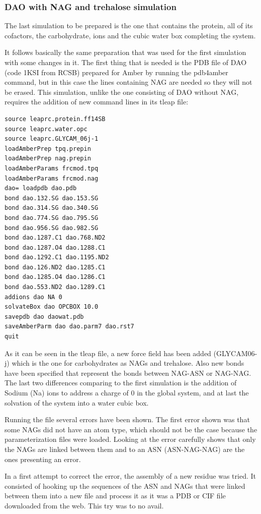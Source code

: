 \documentclass[a4paper]{article}
\begin{document}
\subsubsection{DAO with NAG and trehalose simulation}

The last simulation to be prepared is the one that contains the protein, all of its cofactors, the carbohydrate, ions and the cubic water box completing the system.

It follows basically the same preparation that was used for the first simulation with some changes in it. The first thing that is needed is the PDB file of DAO 
(code 1KSI from RCSB) prepared for Amber by running the pdb4amber command, but in this case the lines containing NAG are needed so they will not be erased. This simulation, unlike the one consisting of DAO without NAG, requires the addition of new command lines in its tleap file:

\begin{verbatim}
source leaprc.protein.ff14SB
source leaprc.water.opc
source leaprc.GLYCAM_06j-1
loadAmberPrep tpq.prepin
loadAmberPrep nag.prepin
loadAmberParams frcmod.tpq
loadAmberParams frcmod.nag
dao= loadpdb dao.pdb
bond dao.132.SG dao.153.SG
bond dao.314.SG dao.340.SG
bond dao.774.SG dao.795.SG
bond dao.956.SG dao.982.SG
bond dao.1287.C1 dao.768.ND2
bond dao.1287.O4 dao.1288.C1
bond dao.1292.C1 dao.1195.ND2
bond dao.126.ND2 dao.1285.C1
bond dao.1285.O4 dao.1286.C1
bond dao.553.ND2 dao.1289.C1
addions dao NA 0
solvateBox dao OPCBOX 10.0
savepdb dao daowat.pdb
saveAmberParm dao dao.parm7 dao.rst7
quit

\end{verbatim}

As it can be seen in the tleap file, a new force field has been added (GLYCAM06-j) which is the one for carbohydrates as NAGs and trehalose. Also new bonds have been specified that represent the bonds between NAG-ASN or NAG-NAG. The last two differences comparing to the first simulation is the addition of Sodium (Na) ions to address a charge of 0 in the global system, and at last the solvation of the system into a water cubic box.

Running the file several errors have been shown. The first error shown was that some NAGs did not have an atom type, which should not be the case because the parameterization files were loaded. Looking at the error carefully shows that only the NAGs are linked between them and to an ASN (ASN-NAG-NAG) are the ones presenting an error.

In a first attempt to correct the error, the assembly of a new residue was tried. It consisted of hooking up the sequences of the ASN and NAGs that were linked between them into a new file and process it as it was a PDB or CIF file downloaded from the web. This try was to no avail.
\end{document}
